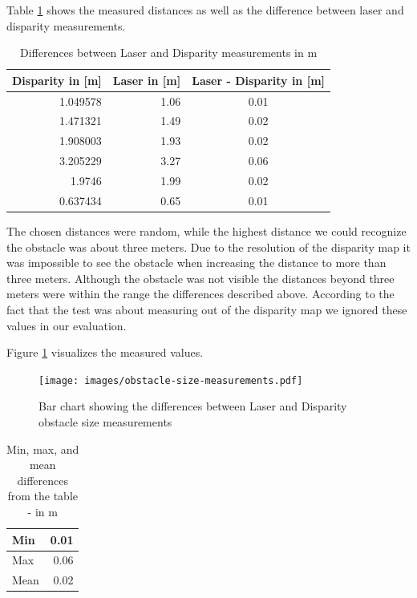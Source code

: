 \documentclass[11pt]{article}
\begin{document}
Table \ref{table:obstacle-size} shows the measured distances as well as the difference between laser and disparity measurements. 

\begin{table}[htbp]
	\begin{center}
	\begin{tabular}{|r|r|c|}
	\hline
	\multicolumn{1}{|l|}{Disparity in [m]} & \multicolumn{1}{l|}{Laser in [m]} & \multicolumn{1}{l|}{Laser - Disparity in [m]} \\ \hline
	1.049578 & 1.06 & 0.01 \\ \hline
	1.471321 & 1.49 & 0.02 \\ \hline
	1.908003 & 1.93 & 0.02 \\ \hline
	3.205229 & 3.27 & 0.06 \\ \hline
	1.9746 & 1.99 & 0.02 \\ \hline
	0.637434 & 0.65 & 0.01 \\ \hline
	\end{tabular}
	\end{center}
	\caption{Differences between Laser and Disparity measurements in m}
	\label{table:obstacle-size}
\end{table}
\pagebreak
The chosen distances were random, while the highest distance we could recognize the obstacle was about three meters. Due to the resolution of the disparity map it was impossible to see the obstacle when increasing the distance to more than three meters. Although the obstacle was not visible the distances beyond three meters were within the range the differences described above. According to the fact that the test was about measuring out of the disparity map we ignored these values in our evaluation.


Figure \ref{fig:obstacle-chart} visualizes the measured values.
\begin{figure}[H]
        \centering
        \texttt{[image: images/obstacle-size-measurements.pdf]}
        \caption{Bar chart showing the differences between Laser and Disparity obstacle size measurements}
        \label{fig:obstacle-chart}
\end{figure}

\begin{table}[htbp]
	\begin{center}
	\begin{tabular}{|l|r|}
	\hline
	Min & 0.01 \\ \hline
	Max & 0.06 \\ \hline
	Mean & 0.02 \\ \hline
	\end{tabular}
	\end{center}
	\caption{Min, max, and mean differences from the table - in m}
	\label{table:obstacle-results}
\end{table}
\end{document}
